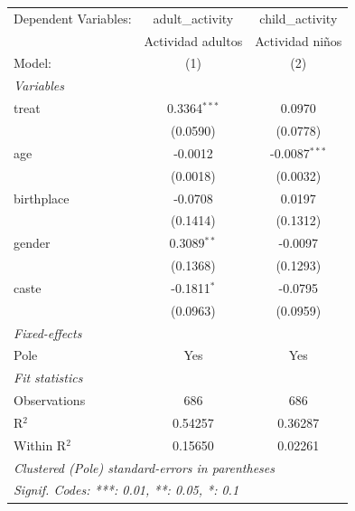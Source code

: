 
\begingroup
\centering
\begin{tabular}{lcc}
   \tabularnewline \midrule \midrule
   Dependent Variables: & adult\_activity   & child\_activity\\   
                        & Actividad adultos & Actividad niños \\   
   Model:               & (1)               & (2)\\  
   \midrule
   \emph{Variables}\\
   treat                & 0.3364$^{***}$    & 0.0970\\   
                        & (0.0590)          & (0.0778)\\   
   age                  & -0.0012           & -0.0087$^{***}$\\   
                        & (0.0018)          & (0.0032)\\   
   birthplace           & -0.0708           & 0.0197\\   
                        & (0.1414)          & (0.1312)\\   
   gender               & 0.3089$^{**}$     & -0.0097\\   
                        & (0.1368)          & (0.1293)\\   
   caste                & -0.1811$^{*}$     & -0.0795\\   
                        & (0.0963)          & (0.0959)\\   
   \midrule
   \emph{Fixed-effects}\\
   Pole                 & Yes               & Yes\\  
   \midrule
   \emph{Fit statistics}\\
   Observations         & 686               & 686\\  
   R$^2$                & 0.54257           & 0.36287\\  
   Within R$^2$         & 0.15650           & 0.02261\\  
   \midrule \midrule
   \multicolumn{3}{l}{\emph{Clustered (Pole) standard-errors in parentheses}}\\
   \multicolumn{3}{l}{\emph{Signif. Codes: ***: 0.01, **: 0.05, *: 0.1}}\\
\end{tabular}
\par\endgroup


